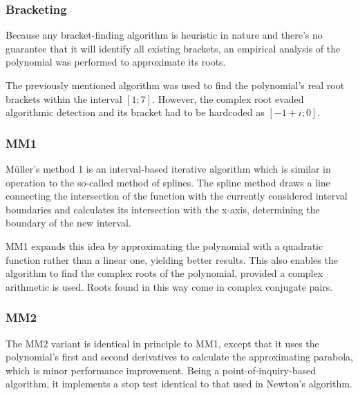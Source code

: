 \documentclass{article}
\begin{document}
	\subsubsection{Bracketing}
	
	Because any bracket-finding algorithm is heuristic in nature and there's no
	guarantee that it will identify all existing brackets, an empirical analysis
	of the polynomial was performed to approximate its roots.
	
	The previously mentioned algorithm was used to find the polynomial's real
	root brackets within the interval $[1; 7]$. However, the complex root evaded
	algorithmic detection and its bracket had to be hardcoded as $[-1 + i; 0]$.
	
	\subsubsection{MM1}
	
	M{\"u}ller's method 1 is an interval-based iterative algorithm which is
	similar in operation to the so-called method of splines. The spline method
	draws a line connecting the intersection of the function with the currently
	considered interval boundaries and calculates its intersection with the
	x-axis, determining the boundary of the new interval.
	
	MM1 expands this idea by approximating the polynomial with a quadratic
	function rather than a linear one, yielding better results. This also
	enables the algorithm to find the complex roots of the polynomial, provided
	a complex arithmetic is used. Roots found in this way come in complex
	conjugate pairs.
	
	\subsubsection{MM2}
	
	The MM2 variant is identical in principle to MM1, except that it uses the
	polynomial's first and second derivatives to calculate the approximating
	parabola, which is minor performance improvement. Being a
	point-of-inquiry-based algorithm, it implements a stop test identical to
	that used in Newton's algorithm.
	
\end{document}
